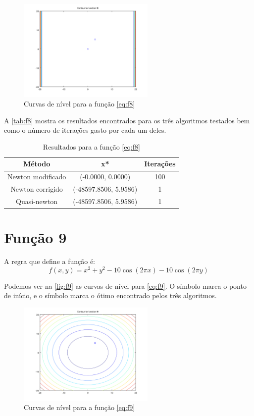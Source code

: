 \documentclass[12pt]{article}
\begin{document}
\begin{figure}[H]
  \centering
  \includegraphics[width=250px]{../matlab/images/f8_contour}
  \caption{Curvas de nível para a função \autoref{eq:f8}}
  \label{fig:f8}
\end{figure}

A \autoref{tab:f8} mostra os resultados encontrados para os três algoritmos testados bem como o número de iterações gasto por cada um deles.

\begin{table}[H]
\centering
\begin{tabular}{*3c}
\toprule
Método			&	x*		&	Iterações\\
\midrule
Newton modificado	&	(-0.0000, 0.0000)	&	100\\
Newton corrigido	&	(-48597.8506, 5.9586)	&	1\\
Quasi-newton		&	(-48597.8506, 5.9586)	&	1\\
\bottomrule
\end{tabular}
\caption{\small{Resultados para a função \autoref{eq:f8} }}
\label{tab:f8}
\end{table}



\section{Função 9}
A regra que define a função é:
\begin{equation}
\label{eq:f9}
f(x, y) = x^2 + y^2 - 10\cos(2\pi x) -10\cos(2\pi y)
\end{equation}

Podemos ver na \autoref{fig:f9} as curvas de nível para \autoref{eq:f9}. O símbolo \textit{\textopenbullet} marca o ponto de início,
e o símbolo \textit{\texttimes} marca o ótimo encontrado pelos três algoritmos.

\begin{figure}[H]
  \centering
  \includegraphics[width=250px]{../matlab/images/f9_contour}
  \caption{Curvas de nível para a função \autoref{eq:f9}}
  \label{fig:f9}
\end{figure}
\end{document}
